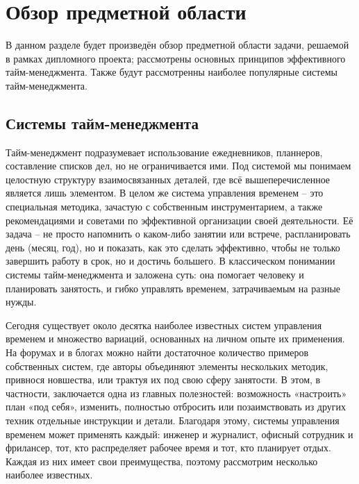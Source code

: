 \section{Обзор предметной области}
\label{sec:domain}

В данном разделе будет произведён обзор предметной области задачи, решаемой в рамках дипломного проекта; рассмотрены основных принципов эффективного тайм-менеджмента.
Также будут рассмотренны наиболее популярные системы тайм-менеджмента.

\subsection{Системы тайм-менеджмента}
\label{sub:domain:time_managament_systems}
Тайм-менеджмент подразумевает использование ежедневников, планнеров, составление списков дел, но не ограничивается ими. Под системой мы понимаем целостную структуру взаимосвязанных деталей, где всё вышеперечисленное является лишь элементом. В целом же система управления временем – это специальная методика, зачастую с собственным инструментарием, а также рекомендациями и советами по эффективной организации своей деятельности. Её задача – не просто напомнить о каком-либо занятии или встрече, распланировать день (месяц, год), но и показать, как это сделать эффективно, чтобы не только завершить работу в срок, но и достичь большего. В классическом понимании системы тайм-менеджмента и заложена суть: она помогает человеку и планировать занятость, и гибко управлять временем, затрачиваемым на разные нужды.

Сегодня существует около десятка наиболее известных систем управления временем и множество вариаций, основанных на личном опыте их применения. На форумах и в блогах можно найти достаточное количество примеров собственных систем, где авторы объединяют элементы нескольких методик, привнося новшества, или трактуя их под свою сферу занятости. В этом, в частности, заключается одна из главных полезностей: возможность «настроить» план «под себя», изменить, полностью отбросить или позаимствовать из других техник отдельные инструкции и детали. Благодаря этому, системы управления временем может применять каждый: инженер и журналист, офисный сотрудник и фрилансер, тот, кто распределяет рабочее время и тот, кто планирует отдых. Каждая из них имеет свои преимущества, поэтому рассмотрим несколько наиболее известных.



